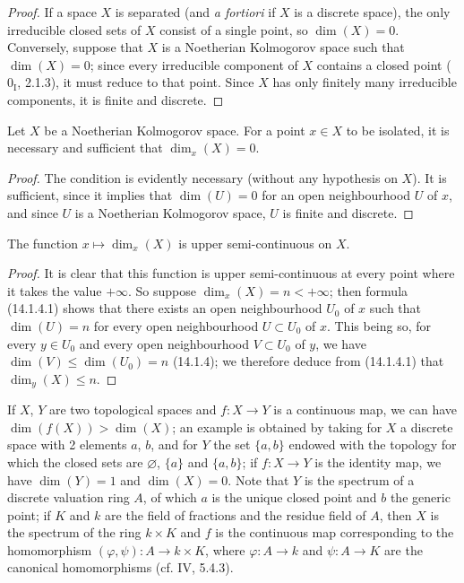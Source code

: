 \begin{proof}
If a space $X$ is separated (and \emph{a fortiori} if $X$ is a discrete
space), the only irreducible closed sets of $X$ consist of a single
point, so $\dim(X)=0$. Conversely, suppose that $X$ is a Noetherian
Kolmogorov space such that $\dim(X)=0$; since every irreducible
component of $X$ contains a closed point ($0_{\mathrm I}$, 2.1.3), it
must reduce to that point. Since $X$ has only finitely many irreducible
components, it is finite and discrete.
\end{proof}

\begin{corollary}[14.1.10]
\label{0.14.1.10}
Let $X$ be a Noetherian Kolmogorov space. For a point $x\in X$ to be
isolated, it is necessary and sufficient that $\dim_x(X)=0$.
\end{corollary}

\begin{proof}
The condition is evidently necessary (without any hypothesis on $X$). It is
sufficient,
since it implies that $\dim(U)=0$ for an open neighbourhood $U$ of $x$, and
since $U$ is a Noetherian Kolmogorov space, $U$ is finite and discrete.
\end{proof}

\begin{proposition}[14.1.11]
\label{0.14.1.11}
The function $x\mapsto\dim_x(X)$ is upper semi-continuous on $X$.
\end{proposition}

\begin{proof}
It is clear that this function is upper semi-continuous at every
point where it takes the value $+\infty$. So suppose $\dim_x(X)=n<+\infty$; then
formula (14.1.4.1) shows that there exists an open neighbourhood $U_0$ of $x$ such
that $\dim(U)=n$ for every open neighbourhood $U\subset U_0$ of $x$. This being so,
for every $y\in U_0$ and every open neighbourhood $V\subset U_0$ of $y$, we have
$\dim(V)\leq\dim(U_0)=n$ (14.1.4); we therefore deduce from (14.1.4.1) that
$\dim_y(X)\leq n$.
\end{proof}

\begin{remark}[14.1.12]
\label{0.14.1.12}
If $X$, $Y$ are two topological spaces and $f:X\to Y$ is a continuous
map, we can have $\dim(f(X))>\dim(X)$; an example is obtained by taking
for $X$ a discrete space with 2 elements $a$, $b$, and for $Y$ the set
$\{a,b\}$ endowed with the topology for which the closed sets are
$\varnothing$, $\{a\}$ and $\{a,b\}$; if $f:X\to Y$ is the identity
map, we have $\dim(Y)=1$ and $\dim(X)=0$. Note that $Y$ is the spectrum
of a discrete valuation ring $A$, of which $a$ is the unique closed point and
$b$ the generic point; if $K$ and $k$ are the field of fractions and the
residue field of $A$, then $X$ is the spectrum of the ring $k\times K$ and $f$
is the continuous map corresponding to the homomorphism
$(\varphi,\psi):A\to k\times K$, where $\varphi:A\to k$ and $\psi:A\to K$ are
the canonical homomorphisms (cf. IV, 5.4.3).
\end{remark}

